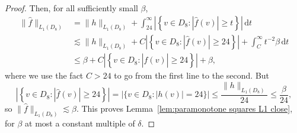 \documentclass[11pt,reqno]{amsart}
\newcommand{\ud}[0]{\,\mathrm{d}}
\newcommand{\0}{\mathbf{0}}
\renewcommand{\1}{\mathbf 1}
\renewcommand{\mid}{:}
\renewcommand{\ge}{\geqslant}
\renewcommand{\le}{\leqslant}
\theoremstyle{remark}
\begin{document}
\begin{proof}
  Then, for all sufficiently small $\beta$,
  \begin{align*}
    \|\hat{f}\|_{L_1(D_8)}
    &=\|h\|_{L_1(D_8)}+\int_{24}^\infty \left|\left\{v\in D_8\mid |\hat{f}(v)|\ge t\right\}\right| \ud t\\
    &\lesssim \|h\|_{L_1(D_8)}+C \left|\left\{v\in D_8\mid |\hat{f}(v)|\ge 24\right\}\right| + \int_{C}^\infty t^{-2}\beta\ud t\\
    &\le \beta+C \left|\left\{v\in D_8\mid |\hat{f}(v)|\ge 24\right\}\right|+\beta,
  \end{align*}
  where we use the fact $C>24$ to go from the first line to the second.
  But
  $$\left|\left\{v\in D_8\mid |\hat{f}(v)|\ge 24\right\}\right|=\bigl|\bigl\{v\in D_8\mid |h(v)|= 24\bigr\}\bigr|\le \frac{\|h\|_{L_1(D_8)}}{24}\le \frac{\beta}{24},$$
  so $\|\hat{f}\|_{L_1(D_8)}\lesssim \beta$.  This proves Lemma~\ref{lem:paramonotone squares L1 close}, for $\beta$ at most a constant multiple of $\delta$.
\end{proof}
\end{document}
